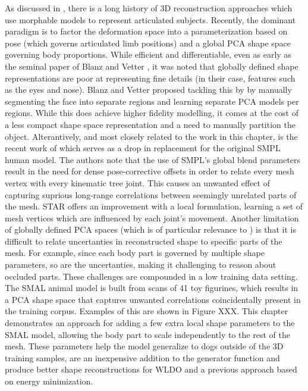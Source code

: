 As discussed in , there is a long history of 3D reconstruction approaches which use morphable models to represent articulated subjects. Recently, the dominant paradigm is to factor the deformation space into a parameterization based on pose (which governs articulated limb positions) and a global PCA shape space governing body proportions. While efficient and differentiable, even as early as the seminal paper of Blanz and Vetter , it was noted that globally defined shape representations are poor at representing fine details (in their case, features such as the eyes and nose). Blanz and Vetter proposed tackling this by by manually segmenting the face into separate regions and learning separate PCA models per regions. While this does achieve higher fidelity modelling, it comes at the cost of a less compact shape space representation and a need to manually partition the object. Alterantively, and most closely related to the work in this chapter, is the recent work of  which serves as a drop in replacement for the original SMPL  human model. The authors note that the use of SMPL's global blend parameters result in the need for dense pose-corrective offsets in order to relate every mesh vertex with every kinematic tree joint. This causes an unwanted effect of capturing suprious long-range correlations between seemingly unrelated parts of the mesh. STAR offers an improvement with a local formulation, learning a set of mesh vertices which are influenced by each joint's movement. Another limitation of globally defined PCA spaces (which is of particular relevance to ) is that it is difficult to relate uncertanties in reconstructed shape to specific parts of the mesh. For example, since each body part is governed by multiple shape parameters, so are the uncertanties, making it challenging to reason about occluded parts.
These challenges are compounded in a low training data setting. The SMAL animal model is built from scans of 41 toy figurines, which results in a PCA shape space that captures unwanted correlations coincidentally present in the training corpus. Examples of this are shown in Figure XXX. This chapter demonstrates an approach for adding a few extra local shape parameters to the SMAL model, allowing the body part to scale independently to the rest of the mesh. These parameters help the model generalize to dogs outside of the 3D training samples, are an inexpensive addition to the generator function and produce better shape reconstructions for WLDO and a previous approach based on energy minimization. 

